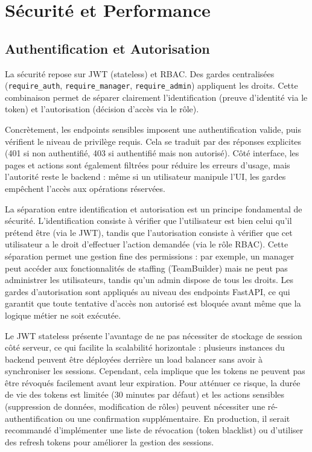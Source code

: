 \documentclass[12pt,a4paper]{report}
\begin{document}
\newpage
\chapter{Sécurité et Performance}

\section{Authentification et Autorisation}
La sécurité repose sur JWT (stateless) et RBAC. Des gardes centralisées (\texttt{require\_auth}, \texttt{require\_manager}, \texttt{require\_admin}) appliquent les droits. Cette combinaison permet de séparer clairement l'identification (preuve d'identité via le token) et l'autorisation (décision d'accès via le rôle).

Concrètement, les endpoints sensibles imposent une authentification valide, puis vérifient le niveau de privilège requis. Cela se traduit par des réponses explicites (401 si non authentifié, 403 si authentifié mais non autorisé). Côté interface, les pages et actions sont également filtrées pour réduire les erreurs d'usage, mais l'autorité reste le backend : même si un utilisateur manipule l'UI, les gardes empêchent l'accès aux opérations réservées.

La séparation entre identification et autorisation est un principe fondamental de sécurité. L'identification consiste à vérifier que l'utilisateur est bien celui qu'il prétend être (via le JWT), tandis que l'autorisation consiste à vérifier que cet utilisateur a le droit d'effectuer l'action demandée (via le rôle RBAC). Cette séparation permet une gestion fine des permissions : par exemple, un manager peut accéder aux fonctionnalités de staffing (TeamBuilder) mais ne peut pas administrer les utilisateurs, tandis qu'un admin dispose de tous les droits. Les gardes d'autorisation sont appliqués au niveau des endpoints FastAPI, ce qui garantit que toute tentative d'accès non autorisé est bloquée avant même que la logique métier ne soit exécutée.

Le JWT stateless présente l'avantage de ne pas nécessiter de stockage de session côté serveur, ce qui facilite la scalabilité horizontale : plusieurs instances du backend peuvent être déployées derrière un load balancer sans avoir à synchroniser les sessions. Cependant, cela implique que les tokens ne peuvent pas être révoqués facilement avant leur expiration. Pour atténuer ce risque, la durée de vie des tokens est limitée (30 minutes par défaut) et les actions sensibles (suppression de données, modification de rôles) peuvent nécessiter une ré-authentification ou une confirmation supplémentaire. En production, il serait recommandé d'implémenter une liste de révocation (token blacklist) ou d'utiliser des refresh tokens pour améliorer la gestion des sessions.
\end{document}
